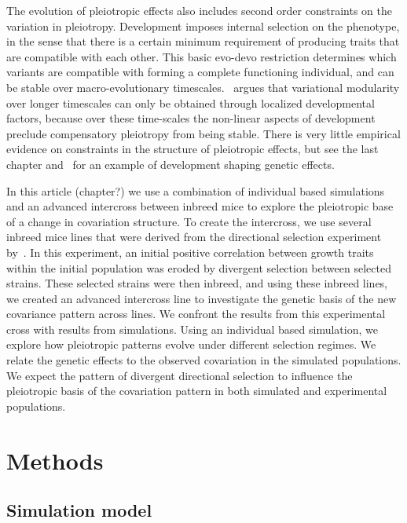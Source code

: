 \begin{refsection}
The evolution of pleiotropic effects also includes second order constraints on
the variation in pleiotropy. Development imposes internal selection on the
phenotype, in the sense that there is a certain minimum requirement of
producing traits that are compatible with each other. This basic evo-devo
restriction determines which variants are compatible with forming a complete
functioning individual, and can be stable over macro-evolutionary
timescales.~\textcite{Mitteroecker2009-jb} argues that variational modularity
over longer timescales can only be obtained through localized developmental
factors, because over these time-scales the non-linear aspects of development
preclude compensatory pleiotropy from being stable. There is very little
empirical evidence on constraints in the structure of pleiotropic effects, but
see the last chapter and~\textcite{Pavlicev2016-jh} for an example of
development shaping genetic effects.

In this article (chapter?) we use a combination of individual based
simulations and an advanced intercross between inbreed mice to explore the
pleiotropic base of a change in covariation structure. To create the
intercross, we use several inbreed mice lines that were derived from the
directional selection experiment by~\textcite{Atchley1997-vn}. In this
experiment, an initial positive correlation between growth traits within the
initial population was eroded by divergent selection between selected strains.
These selected strains were then inbreed, and using these inbreed lines, we
created an advanced intercross line to investigate the genetic basis of the new
covariance pattern across lines. We confront the results from this
experimental cross with results from simulations. Using an individual based
simulation, we explore how pleiotropic patterns evolve under different
selection regimes. We relate the genetic effects to the observed covariation
in the simulated populations. We expect the pattern of divergent directional
selection to influence the pleiotropic basis of the covariation pattern in
both simulated and experimental populations.


\section{Methods}

\subsection{Simulation model}


\end{refsection}
